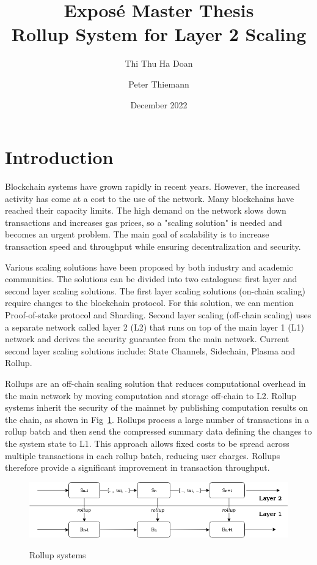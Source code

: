 \documentclass{article}
\title{Expos\'{e} Master Thesis\\
  Rollup System for Layer 2 Scaling}
\author{Thi Thu Ha Doan \and  Peter Thiemann}
\date{December 2022}
\begin{document}
\maketitle

\section{Introduction}
Blockchain systems have grown rapidly in recent years. However, the increased activity has come at a cost to the use of the network. Many blockchains have reached their capacity limits. The high demand on the network slows down transactions and increases gas prices, so a "scaling solution" is needed and becomes an urgent problem. The main goal of scalability is to increase transaction speed and throughput while ensuring decentralization and security.

Various scaling solutions have been proposed by both industry and academic communities. The solutions can be divided into two catalogues: first layer and second layer scaling solutions. The first layer scaling solutions (on-chain scaling) require changes to the blockchain protocol. For this solution, we can mention Proof-of-stake protocol and Sharding. Second layer scaling (off-chain scaling)  uses a separate network called layer 2 (L2) that runs on top of the main layer 1 (L1) network and derives the security guarantee from the main network. Current second layer scaling solutions include: State Channels, Sidechain, Plasma and Rollup.

Rollups are an off-chain scaling solution that reduces computational overhead in the main network by moving computation and storage off-chain to L2. Rollup systems inherit the security of the mainnet by publishing computation results on the chain, as shown in Fig~\ref{rollup-batch}. Rollups process a large number of transactions in a rollup batch and then send the compressed summary data defining the changes to the system state to L1. This approach allows fixed costs to be spread across multiple transactions in each rollup batch, reducing user charges. Rollups therefore provide a significant improvement in transaction throughput.

\begin{figure}[t]
\caption{Rollup systems}
\includegraphics[width=12cm]{rollup-batch}
\label{rollup-batch}
\centering
\end{figure}
\end{document}
